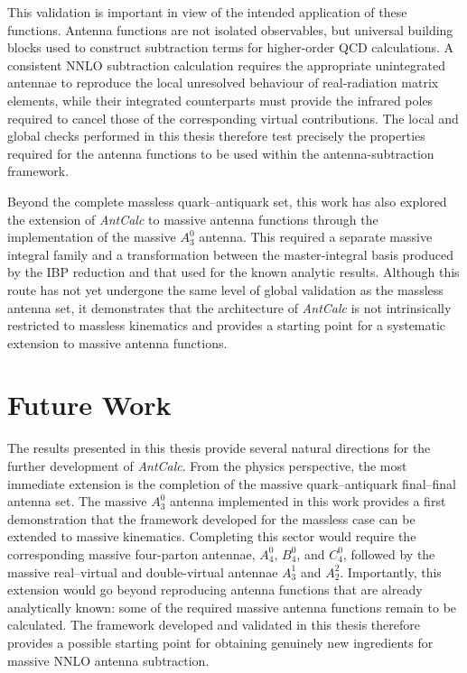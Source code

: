 This validation is important in view of the intended application of these functions. Antenna
functions are not isolated observables, but universal building blocks used to construct subtraction
terms for higher-order QCD calculations. A consistent NNLO subtraction calculation requires the
appropriate unintegrated antennae to reproduce the local unresolved behaviour of real-radiation
matrix elements, while their integrated counterparts must provide the infrared poles required to
cancel those of the corresponding virtual contributions. The local and global checks performed in
this thesis therefore test precisely the properties required for the antenna functions to be used
within the antenna-subtraction framework.

Beyond the complete massless quark--antiquark set, this work has also explored the extension of
\textit{AntCalc} to massive antenna functions through the implementation of the massive $A_3^0$
antenna. This required a separate massive integral family and a transformation between the
master-integral basis produced by the IBP reduction and that used for the known analytic results.
Although this route has not yet undergone the same level of global validation as the massless antenna
set, it demonstrates that the architecture of \textit{AntCalc} is not intrinsically restricted to
massless kinematics and provides a starting point for a systematic extension to massive antenna
functions.

\section*{Future Work}

The results presented in this thesis provide several natural directions for the further development of
\textit{AntCalc}. From the physics perspective, the most immediate extension is the completion of the
massive quark--antiquark final--final antenna set. The massive $A_3^0$ antenna implemented in this
work provides a first demonstration that the framework developed for the massless case can be extended
to massive kinematics. Completing this sector would require the corresponding massive four-parton
antennae, $A_4^0$, $B_4^0$, and $C_4^0$, followed by the massive real--virtual and double-virtual
antennae $A_3^1$ and $A_2^2$. Importantly, this extension would go beyond reproducing antenna
functions that are already analytically known: some of the required massive antenna functions remain
to be calculated. The framework developed and validated in this thesis therefore provides a possible
starting point for obtaining genuinely new ingredients for massive NNLO antenna subtraction.

